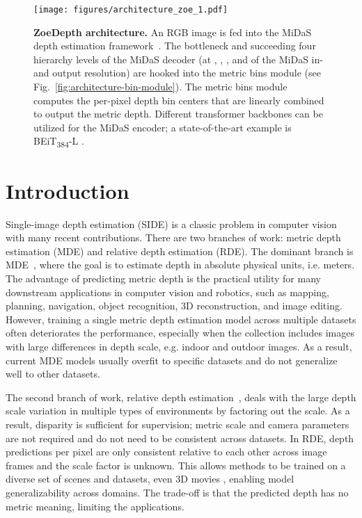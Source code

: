 \documentclass[10pt,twocolumn,letterpaper]{article}
\begin{document}
\begin{figure*}
    \centering
    \texttt{[image: figures/architecture\_zoe\_1.pdf]}
    \caption{\textbf{ZoeDepth architecture.} An RGB image is fed into the MiDaS depth estimation framework~\cite{Ranftl2020MiDaS}. The bottleneck and succeeding four hierarchy levels of the MiDaS decoder (at , , ,  and  of the MiDaS in- and output resolution) are hooked into the metric bins module (see Fig.~\ref{fig:architecture-bin-module}). The metric bins module computes the per-pixel depth bin centers that are linearly combined to output the metric depth.
Different transformer backbones can be utilized for the MiDaS encoder; a state-of-the-art example is BEiT\textsubscript{384}-L \cite{DBLP:journals/corr/abs-2106-08254}.
}
    \label{fig:architecture-zoe}
\end{figure*}

\setlength{\abovedisplayskip}{3pt}
\setlength{\belowdisplayskip}{3pt}

\section{Introduction}
\label{sec:intro}




Single-image depth estimation (SIDE) is a classic problem in computer vision with many recent contributions. There are two branches of work: metric depth estimation (MDE) and relative depth estimation (RDE). The dominant branch is MDE~\cite{bhat2021adabins,bhat2022localbins, yuan2022new, li2022binsformer, SIDEreviewMERTAN2022103441}, where the goal is to estimate depth in absolute physical units, i.e. meters. The advantage of predicting metric depth is the practical utility for many downstream applications in computer vision and robotics, such as mapping, planning, navigation, object recognition, 3D reconstruction, and image editing.
However, training a single metric depth estimation model across multiple datasets often deteriorates the performance, especially when the collection includes images with large differences in depth scale, e.g. indoor and outdoor images. As a result, current MDE models usually overfit to specific datasets and do not generalize well to other datasets.

The second branch of work, relative depth estimation~\cite{SIDEreviewMERTAN2022103441, Ranftl2020MiDaS}, deals with the large depth scale variation in multiple types of environments by factoring out the scale. As a result, disparity is sufficient for supervision; metric scale and camera parameters are not required and do not need to be consistent across datasets. In RDE, depth predictions per pixel are only consistent relative to each other across image frames and the scale factor is unknown. This allows methods to be trained on a diverse set of scenes and datasets, even 3D movies \cite{Ranftl2020MiDaS}, enabling model generalizability across domains. The trade-off is that the predicted depth has no metric meaning, limiting the applications.
\end{document}
